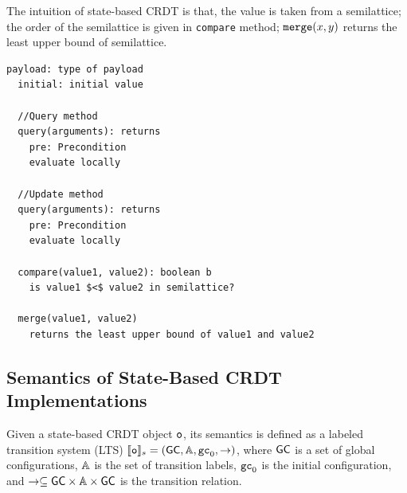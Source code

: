 The intuition of state-based CRDT is that, the value is taken from a semilattice; the order of the semilattice is given in {\tt compare} method; $\alabelshort[\mathtt{merge}]{x,y}$ returns the least upper bound of semilattice.


\begin{minipage}[t]{1.0\linewidth}
\begin{lstlisting}[frame=top,caption={Outline of state-based CRDT},
captionpos=b,label={lst:outline of state-based CRDT}]
  payload: type of payload
  initial: initial value

  //Query method
  query(arguments): returns
    pre: Precondition
    evaluate locally

  //Update method
  query(arguments): returns
    pre: Precondition
    evaluate locally

  compare(value1, value2): boolean b
    is value1 $<$ value2 in semilattice?

  merge(value1, value2)
    returns the least upper bound of value1 and value2
\end{lstlisting}
\end{minipage}









\subsection{Semantics of State-Based CRDT Implementations}
\label{subsec:semantics of state-based CRDT implementations}

Given a state-based CRDT object $\aobj$, its semantics is defined as a labeled transition system (LTS) $\llbracket \aobj \rrbracket_s = (\globalstates,\acts,\aglobalstate_0,\rightarrow)$, where $\globalstates$ is a set of global configurations, $\acts$ is the set of transition labels, $\aglobalstate_0$ is the initial configuration, and $\rightarrow\subseteq \globalstates \times \acts\times \globalstates$ is the transition relation.

